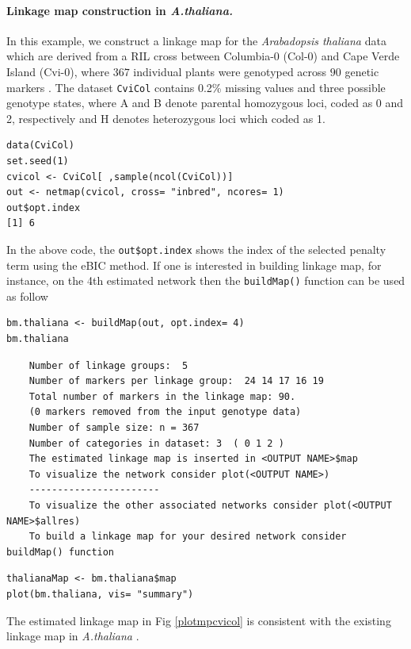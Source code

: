 \paragraph{Linkage map construction in \emph{A.thaliana.}}  In this example, we construct a linkage map for the \emph{Arabadopsis thaliana} data which are derived from a RIL cross between Columbia-0 (Col-0) and Cape Verde Island (Cvi-0), where $367$ individual plants were genotyped across $90$ genetic markers \citep{simon2008qtl}. The dataset {\tt CviCol} contains 0.2\% missing values and three possible genotype states, where A and B denote parental homozygous loci, coded as 0 and 2, respectively and H denotes heterozygous loci which coded as 1.

\begin{verbatim}
data(CviCol)
set.seed(1)
cvicol <- CviCol[ ,sample(ncol(CviCol))]
out <- netmap(cvicol, cross= "inbred", ncores= 1)
out$opt.index
[1] 6
\end{verbatim}
In the above code, the {\tt out\$opt.index} shows the index of the selected penalty term using the eBIC method. If one is interested in building linkage map, for instance, on the 4th estimated network then the {\tt buildMap()} function can be used as follow
\begin{verbatim}
bm.thaliana <- buildMap(out, opt.index= 4)
bm.thaliana
\end{verbatim}
{\footnotesize
	\begin{verbatim}
	Number of linkage groups:  5 
	Number of markers per linkage group:  24 14 17 16 19 
	Total number of markers in the linkage map: 90. 
	(0 markers removed from the input genotype data) 
	Number of sample size: n = 367 
	Number of categories in dataset: 3  ( 0 1 2 ) 
	The estimated linkage map is inserted in <OUTPUT NAME>$map 
	To visualize the network consider plot(<OUTPUT NAME>) 
	----------------------- 
	To visualize the other associated networks consider plot(<OUTPUT NAME>$allres) 
	To build a linkage map for your desired network consider buildMap() function 
	\end{verbatim}}
\begin{verbatim}
thalianaMap <- bm.thaliana$map
plot(bm.thaliana, vis= "summary")
\end{verbatim}
The estimated linkage map in Fig \ref{plotmpcvicol} is consistent with the existing linkage map in \emph{A.thaliana} \citep{simon2008qtl, behrouzi2019novo}. 

